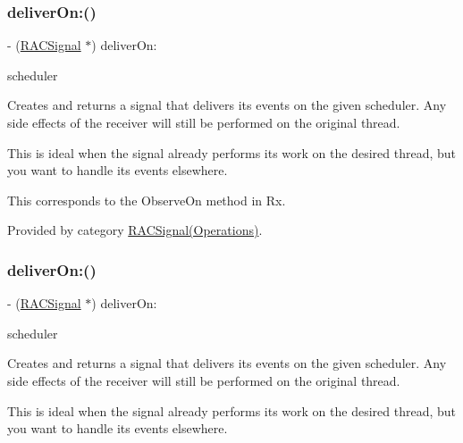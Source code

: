 \subsubsection{\texorpdfstring{deliver\+On\+:()}{deliverOn:()}\hspace{0.1cm}{\footnotesize\ttfamily [2/3]}}
{\footnotesize\ttfamily -\/ (\mbox{\hyperlink{interface_r_a_c_signal}{R\+A\+C\+Signal}} $\ast$) deliver\+On\+: \begin{DoxyParamCaption}\item[{(\mbox{\hyperlink{interface_r_a_c_scheduler}{R\+A\+C\+Scheduler}} $\ast$)}]{scheduler }\end{DoxyParamCaption}}

Creates and returns a signal that delivers its events on the given scheduler. Any side effects of the receiver will still be performed on the original thread.

This is ideal when the signal already performs its work on the desired thread, but you want to handle its events elsewhere.

This corresponds to the {\ttfamily Observe\+On} method in Rx. 

Provided by category \mbox{\hyperlink{category_r_a_c_signal_07_operations_08_a69e4dc1c476da42ed829caed84fbd258}{R\+A\+C\+Signal(\+Operations)}}.

\mbox{\label{interface_r_a_c_signal_a69e4dc1c476da42ed829caed84fbd258}} 
\subsubsection{\texorpdfstring{deliver\+On\+:()}{deliverOn:()}\hspace{0.1cm}{\footnotesize\ttfamily [3/3]}}
{\footnotesize\ttfamily -\/ (\mbox{\hyperlink{interface_r_a_c_signal}{R\+A\+C\+Signal}} $\ast$) deliver\+On\+: \begin{DoxyParamCaption}\item[{(\mbox{\hyperlink{interface_r_a_c_scheduler}{R\+A\+C\+Scheduler}} $\ast$)}]{scheduler }\end{DoxyParamCaption}}

Creates and returns a signal that delivers its events on the given scheduler. Any side effects of the receiver will still be performed on the original thread.

This is ideal when the signal already performs its work on the desired thread, but you want to handle its events elsewhere.

